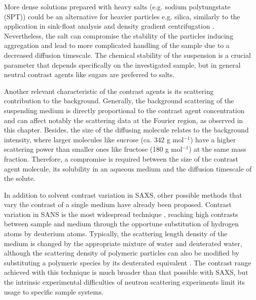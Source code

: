 More dense solutions prepared with heavy salts (e.g. sodium polytungstate (SPT)) could be an alternative for heavier particles e.g. silica, similarly to the application in sink-float analysis and density gradient centrifugation \citep{rhodes_fine_1991,mitchell_setup_2010}. Nevertheless, the salt can compromise the stability of the particles inducing aggregation and lead to more complicated handling of the sample due to a decreased diffusion timescale. The chemical stability of the suspension is a crucial parameter that depends specifically on the investigated sample, but in general neutral contrast agents like sugars are preferred to salts.

Another relevant characteristic of the contrast agents is its scattering  contribution to the background. Generally, the background scattering of the suspending medium is directly proportional to the contrast agent concentration and can affect notably the scattering data at the Fourier region, as observed in this chapter. Besides, the size of the diffusing molecule relates to the background intensity, where larger molecules like sucrose (ca. 342 g mol$^{-1}$) have a higher scattering power than smaller ones like fructose (180 g mol$^{-1}$) at the same mass fraction. Therefore, a compromise  is required between the size of the contrast agent molecule, its solubility in an aqueous medium and the diffusion timescale of the solute.

In addition to solvent contrast variation in SAXS, other possible methods that vary the contrast of a single medium have already been proposed. Contrast variation in SANS is the most widespread technique \citep{ballauff_analysis_2011, ballauff_saxs_2001-1}, reaching high contrasts between sample and medium through the opportune substitution of hydrogen atoms by deuterium atoms. Typically, the scattering length density of the medium is changed by the appropriate mixture of water and deuterated water, although the scattering density of polymeric particles can also be modified by substituting a polymeric species by its deuterated equivalent \citep{rosenfeldt_distribution_2002}. The contrast range achieved with this technique is much broader than that possible with SAXS, but the intrinsic experimental difficulties of neutron scattering experiments limit its usage to specific sample systems.

